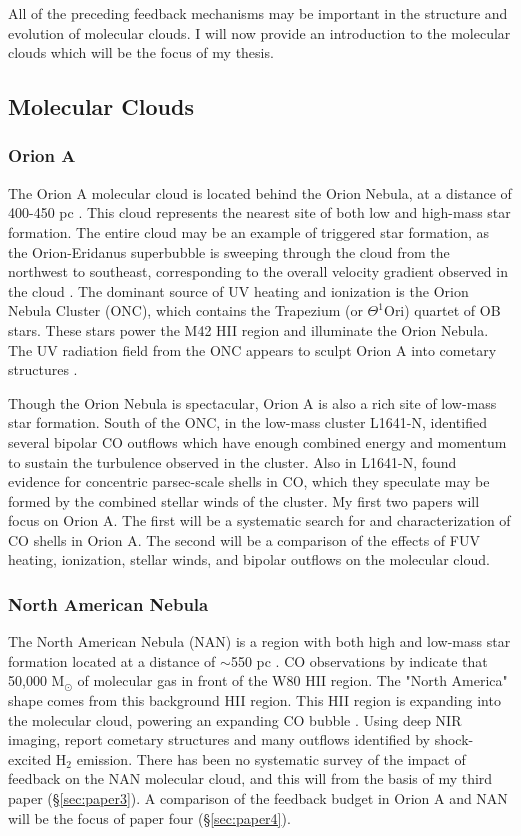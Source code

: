 All of the preceding feedback mechanisms may be important in the structure and evolution of molecular clouds. I will now provide an introduction to the molecular clouds which will be the focus of my thesis.

\subsection{Molecular Clouds}\label{sec:clouds}

\subsubsection{Orion A}\label{sec:orion}
The Orion A molecular cloud is located behind the Orion Nebula, at a distance of 400-450 pc \cite{Menten07}. This cloud represents the nearest site of both low and high-mass star formation. The entire cloud may be an example of triggered star formation, as the Orion-Eridanus superbubble is sweeping through the cloud from the northwest to southeast, corresponding to the overall velocity gradient observed in the cloud \cite{Bally08}. The dominant source of UV heating and ionization is the Orion Nebula Cluster (ONC), which contains the Trapezium (or $\Theta^1$Ori) quartet of OB stars. These stars power the M42 HII region and illuminate the Orion Nebula. The UV radiation field from the ONC appears to sculpt Orion A into cometary structures \cite{Bally08}.

Though the Orion Nebula is spectacular, Orion A is also a rich site of low-mass star formation. South of the ONC, in the low-mass cluster L1641-N, \citet{Stanke_2007} identified several bipolar CO outflows which have enough combined energy and momentum to sustain the turbulence observed in the cluster. Also in L1641-N, \citet{Nakamura_2012} found evidence for concentric parsec-scale shells in CO, which they speculate may be formed by the combined stellar winds of the cluster. My first two papers will focus on Orion A. The first will be a systematic search for and characterization of CO shells in Orion A. The second will be a comparison of the effects of FUV heating, ionization, stellar winds, and bipolar outflows on the molecular cloud.

\subsubsection{North American Nebula}\label{sec:nan}
The North American Nebula (NAN) is a region with both high and low-mass star formation located at a distance of $\sim$550 pc \cite{Laugalys06}. CO observations by \citet{Zhang14} indicate that 50,000 M$_\odot$ of molecular gas in front of the W80 HII region. The "North America" shape comes from this background HII region. This HII region is expanding into the molecular cloud, powering an expanding CO bubble \cite{Bally80}. Using deep NIR imaging, \citet{Bally14} report cometary structures and many outflows identified by shock-excited H$_2$ emission. There has been no systematic survey of the impact of feedback on the NAN molecular cloud, and this will from the basis of my third paper (\S\ref{sec:paper3}). A comparison of the feedback budget in Orion A and NAN will be the focus of paper four (\S\ref{sec:paper4}). 
  
  